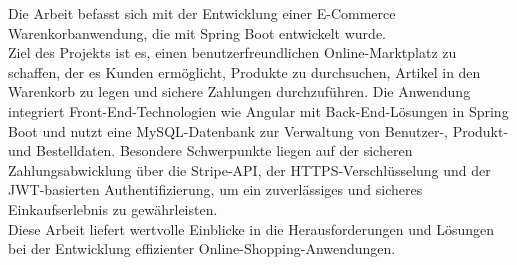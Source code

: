 \kurzfassung

Die Arbeit befasst sich mit der Entwicklung einer E-Commerce Warenkorbanwendung, die mit Spring Boot entwickelt wurde. \\
Ziel des Projekts ist es, einen benutzerfreundlichen Online-Marktplatz zu schaffen, der es Kunden ermöglicht, Produkte zu durchsuchen, Artikel in den Warenkorb zu legen und sichere Zahlungen durchzuführen. Die Anwendung integriert Front-End-Technologien wie Angular mit Back-End-Lösungen in Spring Boot und nutzt eine MySQL-Datenbank zur Verwaltung von Benutzer-, Produkt- und Bestelldaten. Besondere Schwerpunkte liegen auf der sicheren Zahlungsabwicklung über die Stripe-API, der HTTPS-Verschlüsselung und der JWT-basierten Authentifizierung, um ein zuverlässiges und sicheres Einkaufserlebnis zu gewährleisten. \\
Diese Arbeit liefert wertvolle Einblicke in die Herausforderungen und Lösungen bei der Entwicklung effizienter Online-Shopping-Anwendungen.

